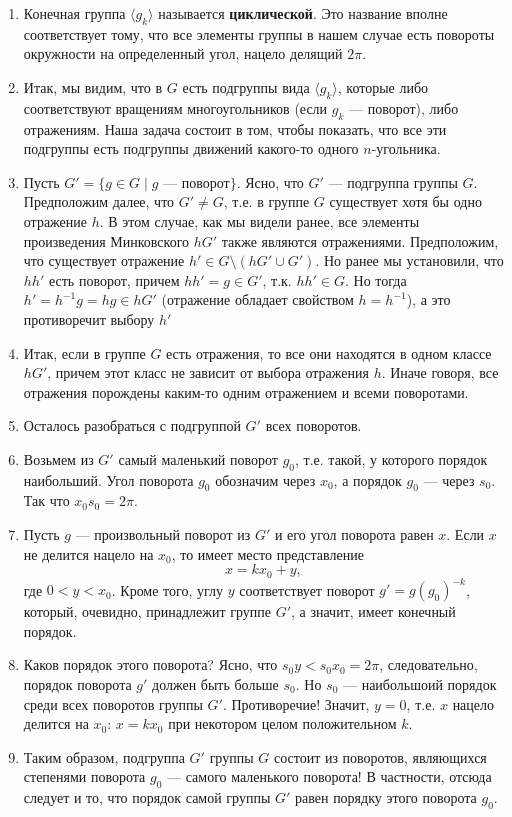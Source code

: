 \begin{enumerate}
\item Конечная группа $\langle g_k\rangle$ называется \textbf{циклической}. Это название вполне соответствует тому, что все элементы группы в нашем случае есть повороты окружности на определенный угол, нацело делящий $2\pi$.
\item Итак, мы видим, что в $G$ есть подгруппы вида $\langle g_k\rangle$, которые либо соответствуют вращениям многоугольников (если $g_k$ --- поворот), либо отражениям. Наша задача состоит в том, чтобы показать, что все эти подгруппы есть подгруппы движений какого-то одного $n$-угольника.
\item Пусть $G'=\{g\in G\mid g\mbox{ --- поворот}\}$. Ясно, что $G'$ --- подгруппа группы $G$. Предположим далее, что $G'\ne G$, т.е. в группе $G$ существует хотя бы одно отражение $h$. В этом случае, как мы видели ранее, все элементы произведения Минковского $hG'$ также являются отражениями. Предположим, что существует отражение $h'\in G\setminus (hG'\cup G')$. Но ранее мы установили, что $hh'$ есть поворот, причем $hh'=g\in G'$, т.к. $hh'\in G$.
 Но тогда $h'=h^{-1}g=hg\in hG'$ (отражение обладает свойством $h=h^{-1}$), а это противоречит выбору $h'$
\item Итак, если в группе $G$ есть отражения, то все они находятся в одном классе $hG'$, причем этот класс не зависит от выбора отражения $h$. Иначе говоря, все отражения порождены каким-то одним отражением и всеми поворотами.
\item Осталось разобраться с подгруппой $G'$ всех поворотов.
\item Возьмем из $G'$ самый маленький поворот $g_0$, т.е. такой, у которого порядок наибольший. Угол поворота $g_0$ обозначим через $x_0$, а порядок $g_0$ --- через $s_0$. Так что $x_0s_0=2\pi$.
\item Пусть $g$ --- произвольный поворот из $G'$ и его угол поворота равен $x$. Если $x$ не делится нацело на $x_0$, то имеет место представление
$$
x = kx_0+y,
$$
где $0<y<x_0$. Кроме того, углу $y$ соответствует поворот $g'=g(g_0)^{-k}$, который, очевидно, принадлежит группе $G'$, а значит, имеет конечный порядок.
\item Каков порядок этого поворота? Ясно, что $s_0y<s_0x_0=2\pi$, следовательно, порядок поворота $g'$ должен быть больше $s_0$. Но $s_0$ --- наибольшоий порядок среди всех поворотов группы $G'$. Противоречие! Значит, $y=0$, т.е. $x$ нацело делится на $x_0$: $x=kx_0$ при некотором целом положительном $k$.
\item Таким образом, подгруппа $G'$ группы $G$ состоит из поворотов, являющихся степенями поворота $g_0$ --- самого маленького поворота! В частности, отсюда следует и то, что порядок самой группы $G'$ равен порядку этого поворота $g_0$.

\end{enumerate}
